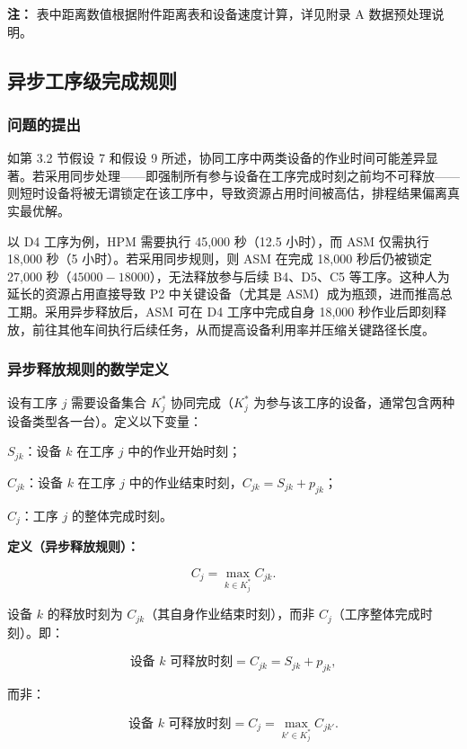 \documentclass[UTF8,a4paper,12pt]{ctexart}
\begin{document}
\noindent\textbf{注：} 表中距离数值根据附件距离表和设备速度计算，详见附录 A 数据预处理说明。

\subsection{异步工序级完成规则}
\subsubsection{问题的提出}
如第 3.2 节假设 7 和假设 9 所述，协同工序中两类设备的作业时间可能差异显著。若采用同步处理——即强制所有参与设备在工序完成时刻之前均不可释放——则短时设备将被无谓锁定在该工序中，导致资源占用时间被高估，排程结果偏离真实最优解。

以 D4 工序为例，HPM 需要执行 45,000 秒（12.5 小时），而 ASM 仅需执行 18,000 秒（5 小时）。若采用同步规则，则 ASM 在完成 18,000 秒后仍被锁定 27,000 秒（$45000 - 18000$），无法释放参与后续 B4、D5、C5 等工序。这种人为延长的资源占用直接导致 P2 中关键设备（尤其是 ASM）成为瓶颈，进而推高总工期。采用异步释放后，ASM 可在 D4 工序中完成自身 18,000 秒作业后即刻释放，前往其他车间执行后续任务，从而提高设备利用率并压缩关键路径长度。

\subsubsection{异步释放规则的数学定义}
设有工序 $j$ 需要设备集合 $K_j^*$ 协同完成（$K_j^*$ 为参与该工序的设备，通常包含两种设备类型各一台）。定义以下变量：

$S_{jk}$：设备 $k$ 在工序 $j$ 中的作业开始时刻；

$C_{jk}$：设备 $k$ 在工序 $j$ 中的作业结束时刻，$C_{jk} = S_{jk} + p_{jk}$；

$C_j$：工序 $j$ 的整体完成时刻。

\textbf{定义（异步释放规则）：}

\begin{equation}
C_j = \max_{k \in K_j^*} C_{jk}.
\end{equation}

设备 $k$ 的释放时刻为 $C_{jk}$（其自身作业结束时刻），而非 $C_j$（工序整体完成时刻）。即：

\begin{equation}
\text{设备 } k \text{ 可释放时刻} = C_{jk} = S_{jk} + p_{jk},
\end{equation}

而非：

$$
\text{设备 } k \text{ 可释放时刻} = C_j = \max_{k' \in K_j^*} C_{jk'}.
$$
\end{document}
